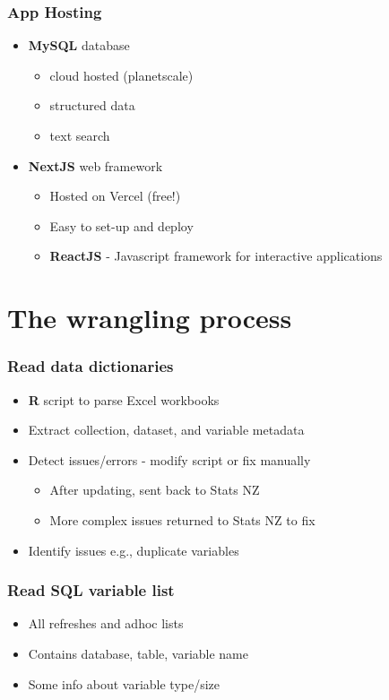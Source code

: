 \documentclass{beamer}
\newcommand{\prog}[1]{\textsf{\bfseries #1}}
\begin{document}
\begin{frame}
    \frametitle{App Hosting}

    \begin{itemize}
        \item \prog{MySQL} database
        \begin{itemize}
            \item cloud hosted (planetscale)
            \item structured data
            \item text search
        \end{itemize}
        \item \prog{NextJS} web framework
        \begin{itemize}
            \item Hosted on Vercel (free!)
            \item Easy to set-up and deploy
            \item \prog{ReactJS} - Javascript framework for interactive applications
        \end{itemize}
    \end{itemize}
\end{frame}

\section{The wrangling process}

\begin{frame}
    \frametitle{Read data dictionaries}

    \begin{itemize}
        \item \prog{R} script to parse Excel workbooks
        \item Extract collection, dataset, and variable metadata
        \item Detect issues/errors - modify script or fix manually
        \begin{itemize}
            \item After updating, sent back to Stats NZ
            \item More complex issues returned to Stats NZ to fix
        \end{itemize}
        \item Identify issues e.g., duplicate variables
    \end{itemize}
\end{frame}

\begin{frame}
    \frametitle{Read SQL variable list}

    \begin{itemize}
        \item All refreshes and adhoc lists
        \item Contains database, table, variable name
        \item Some info about variable type/size
    \end{itemize}
\end{frame}
\end{document}
